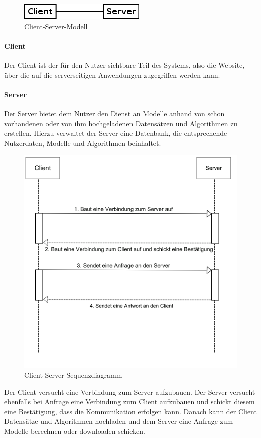 %

\begin{figure}[h]
	\centering
	\includegraphics[width=0.5\linewidth]{Grafik/Diagramm/Pattern/ClientServer/Kontext.png}
	\caption[]{Client-Server-Modell}
\end{figure}

\paragraph{Client}
Der Client ist der für den Nutzer sichtbare Teil des Systems, also die Website, über die auf die serverseitigen Anwendungen zugegriffen werden kann.

\paragraph{Server}
Der Server bietet dem Nutzer den Dienst an Modelle anhand von schon vorhandenen oder von ihm hochgeladenen Datensätzen und Algorithmen zu erstellen. Hierzu verwaltet der Server eine Datenbank, die entsprechende Nutzerdaten, Modelle und Algorithmen beinhaltet.\\

\begin{figure}[h]
	\centering
	\includegraphics[width=0.6\linewidth]{Grafik/Diagramm/Pattern/ClientServer/Sequenzdiagramm.png}
	\caption[]{Client-Server-Sequenzdiagramm}
\end{figure}\pagebreak
\noindent Der Client versucht eine Verbindung zum Server aufzubauen. Der Server versucht ebenfalls bei Anfrage eine Verbindung zum Client aufzubauen und schickt diesem eine Bestätigung, dass die Kommunikation erfolgen kann. Danach kann der Client Datensätze und Algorithmen hochladen und dem Server eine Anfrage zum Modelle berechnen oder downloaden schicken.

